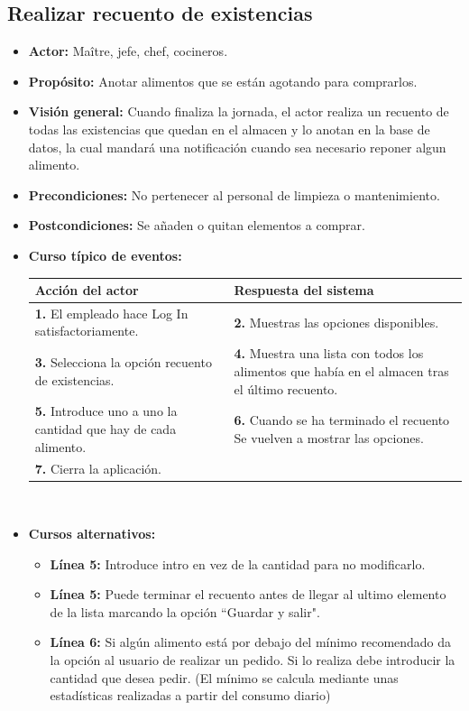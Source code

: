 \documentclass[spanish,a4paper,11pt, twoside]{report}	%
\begin{document}
	\subsection{Realizar recuento de existencias}
			\begin{itemize}
			\item \textbf{Actor:} Maître, jefe, chef, cocineros.
			\item \textbf{Propósito: } Anotar alimentos que se están agotando para comprarlos.
			\item \textbf{Visión general:} Cuando finaliza la jornada, el actor realiza un recuento de todas las existencias que quedan en el almacen y lo anotan en la base de datos, la cual mandará una notificación cuando sea necesario reponer algun alimento.
			\item \textbf{Precondiciones:} No pertenecer al personal de limpieza o mantenimiento.
			\item \textbf{Postcondiciones:} Se añaden o quitan elementos a comprar.
			\item \textbf{Curso típico de eventos:} 	\\
				\begin{tabular}{|p{6cm}||p{6cm}|}
				\hline
				\textbf{Acción del actor} & \textbf{Respuesta del sistema} \\ \hline
				\textbf{1.} El empleado hace Log In satisfactoriamente. & \textbf{2.} Muestras las opciones disponibles. \\ \hline
				\textbf{3.} Selecciona la opción recuento de existencias. & \textbf{4.} Muestra una lista con todos los alimentos que había en el almacen tras el último recuento. \\ \hline
				\textbf{5.} Introduce uno a uno la cantidad que hay de cada alimento. & \textbf{6.} Cuando se ha terminado el recuento Se vuelven a mostrar las opciones. \\ \hline
				\textbf{7.}  Cierra la aplicación. &   \\ \hline
			\end{tabular}
			\\
			\item \textbf{Cursos alternativos:} 
			\begin{itemize}
			\item  \textbf{Línea 5:} Introduce intro en vez de la cantidad para no modificarlo.
			\item  \textbf{Línea 5:} Puede terminar el recuento antes de llegar al ultimo elemento de la lista marcando la opción “Guardar y salir".
			\item  \textbf{Línea 6:} Si algún alimento está por debajo del mínimo recomendado da la opción al usuario de realizar un pedido. Si lo realiza debe introducir la cantidad que desea pedir. (El mínimo se calcula mediante unas estadísticas realizadas a partir del consumo diario)
			\end {itemize}
		\end {itemize}
\end{document}
